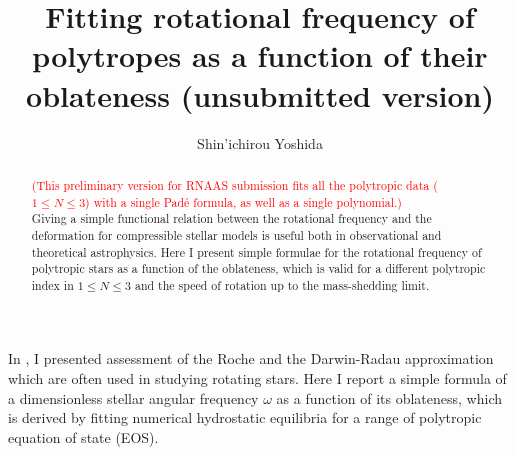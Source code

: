 \documentclass[RNAAS, a4paper, dvipdfmx]{aastex631} %
\begin{document}
\title{Fitting rotational frequency of polytropes as a function of their oblateness (unsubmitted version)}

\author{Shin'ichirou Yoshida}



\begin{abstract}
\textcolor{red}{(This preliminary version for RNAAS submission fits all the polytropic data ($1\le N\le 3$)
with a single Pad\'{e} formula, as well as a single polynomial.)}\\
Giving a simple functional relation between the rotational frequency and
the deformation for compressible stellar models is useful both in observational
and theoretical astrophysics.
Here I present simple formulae for the rotational frequency of polytropic
stars as a function of the oblateness, which is valid for a different polytropic
index in $1\le N\le 3$ and the speed of rotation up to the mass-shedding limit.
\end{abstract}


\section{} 

In \cite{Yoshida}, I presented assessment of the Roche
and the Darwin-Radau approximation which are often used in studying
rotating stars. Here I report a simple formula of a dimensionless stellar
angular frequency $\omega$ as a function of its oblateness, which
is derived by fitting numerical hydrostatic equilibria for a range of
polytropic equation of state (EOS).
\end{document}
